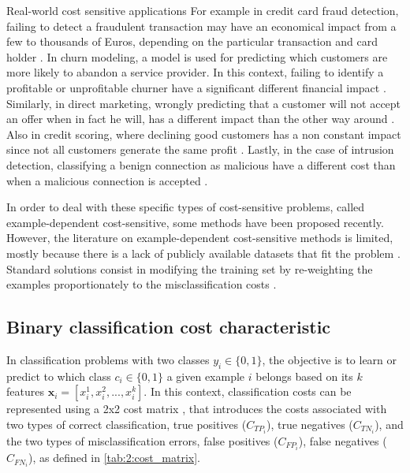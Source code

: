   \begin{remark}{Real-world cost sensitive applications}
  For example in credit card fraud detection, failing to detect a fraudulent transaction may have 
  an economical impact from a few to thousands of Euros, depending on the particular transaction 
  and card holder \citep{Sahin2013}. In churn modeling, a model is used for predicting which
  customers are more likely to abandon a service provider. In this context, failing to identify a 
  profitable or unprofitable churner have a significant different financial impact 
  \citep{Glady2009}. Similarly, in direct marketing, wrongly predicting that a customer will not 
  accept an offer when in fact he will, has a different impact than the other way around 
  \citep{Zadrozny2003}. Also in credit scoring, where declining good customers has a non constant 
  impact since not all  customers generate the same profit \citep{Verbraken2014}. Lastly, in the 
  case of intrusion   detection, classifying a benign connection as malicious have a different cost 
  than when a   malicious connection is accepted \citep{Ma2011}.
  \end{remark}

  In order to deal with these specific types of cost-sensitive problems, called example-dependent
  cost-sensitive, some methods have been proposed recently. However, the literature on 
  example-dependent cost-sensitive methods is limited, mostly because there is a lack of publicly 
  available datasets that fit the problem \citep{MacAodha2013}. Standard solutions consist in 
  modifying the training set by re-weighting the examples proportionately to the misclassification 
  costs \citep{Elkan2001,Zadrozny2003}.

  
\subsection{Binary classification cost characteristic}
\label{sec:2:cost_characteristic}

  In classification problems with two classes $y_i \in \{0,1\}$, the objective is to learn or 
  predict to which class $c_i \in \{0,1\}$ a given example $i$ belongs based on its $k$ features 
  $\mathbf{x}_i=[x^1_i, x^2_i,...,x^k_i]$. In this context, classification costs can be 
  represented using a 2x2 cost matrix \citep{Elkan2001}, that introduces the costs 
  associated with   two types of correct   classification, true positives ($C_{TP_i}$), true 
  negatives ($C_{TN_i}$),   and the two  types of   misclassification errors, false positives 
  ($C_{FP_i}$), false negatives   ($C_{FN_i}$), as   defined in \tablename{ 
  \ref{tab:2:cost_matrix}}.
  \label{ntn:ch2:2}
  
